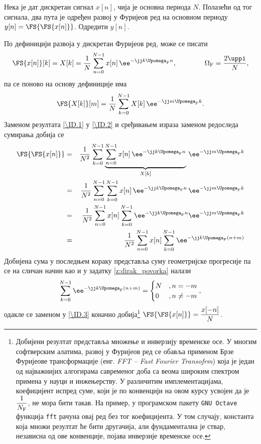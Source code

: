 \PID
Нека је дат дискретан сигнал $x[n]$, чија је основна периода $N$. Полазећи од тог сигнала, два пута је одређен развој у Фуријеов ред на 
основном периоду $y[n] = \FS{\FS{x[n]}}$. Одредити $y[n]$. 

\RESENJE
По дефиницији развоја у дискретан Фуријеов ред, може се писати 
\begin{equation}
    \FS{x[n]}[k] = X[k] = \dfrac{1}{N} \sum_{n = 0}^{N-1} x[n] \, \ee^{-\jj k \Upomega_{\rm F} n}, \qquad\qquad \Omega_{\rm F} = \dfrac{2\uppi}{N},
    \label{\ID.1}
\end{equation}
па се поново на основу дефиниције има 
\begin{eqnarray}
    \FS{X[k]}[m] = \dfrac{1}{N} \sum_{k = 0}^{N-1} X[k] \, \ee^{-\jj m \Upomega_{\rm F} k}. \label{\ID.2}
\end{eqnarray}
Заменом резултата \eqref{\ID.1} у \eqref{\ID.2} и сређивањем израза заменом редоследа сумирања добија се 
\begin{eqnarray}
    \FS{\FS{x[n]}} 
    &=&
    \dfrac{1}{N^2} 
    \sum_{k = 0}^{N-1} 
    \underbrace{ \sum_{n = 0}^{N-1} x[n] \, \ee^{-\jj k \Upomega_{\rm F} n} }_{X[k]}
    \, \ee^{-\jj m \Upomega_{\rm F} k}
    \\ 
    &=& 
    \dfrac{1}{N^2} 
    \sum_{n = 0}^{N-1}
    \sum_{k = 0}^{N-1} 
    x[n] \, \ee^{-\jj k \Upomega_{\rm F} n} 
    \, \ee^{-\jj m \Upomega_{\rm F} k} \\
    &=& 
    \dfrac{1}{N^2} 
    \sum_{n = 0}^{N-1}
    x[n]
    \sum_{k = 0}^{N-1} 
    \ee^{-\jj k \Upomega_{\rm F} n} 
    \ee^{-\jj m \Upomega_{\rm F} k}
    \\
    &=& 
    \dfrac{1}{N^2} 
    \sum_{n = 0}^{N-1}
    x[n]
    \sum_{k = 0}^{N-1} 
    \ee^{-\jj k \Upomega_{\rm F} (n + m)} \label{\ID.3}
\end{eqnarray}
Добијена сума у последњем кораку представља суму геометријске прогресије па се на сличан начин као и у задатку
\ref{z:dirak_povorka} налази
\begin{equation}
    \sum_{k = 0}^{N-1} 
    \ee^{-\jj k \Upomega_{\rm F} (n + m)}  
    = 
    \begin{cases}
        N &, n = -m \\
        0 &, n \neq -m
    \end{cases},
\end{equation}
одакле се заменом у \eqref{\ID.3} коначно добија\footnote{Добијени резултат 
представља множење и инверзију временске осе. У многим софтверским алатима, развој у Фуријеов ред се обавља 
применом Брзе Фуријеове трансформације (енг. \textit{FFT -- Fast Fourier Transofrm}) која је један од најважнијих алгогирама савременог
доба са веома широким спектром примена у науци и инжењерству. 
У различитим имплементацијама, коефицијент испред суме, који је по конвенцији 
на овом курсу усвојен да је $\dfrac{1}{N_{\rm F}}$,  не мора бити такав. 
На пример, у програмском пакету \texttt{GNU Octave} функција \texttt{fft} рачуна 
овај ред без тог коефицијента. У том случају, константа која множи резултат ће бити другачија, 
али фундаментална је ствар, независна од ове конвенције, појава инверзије временске осе.} $\FS{\FS{x[n]}} = \dfrac{x[-n]}{N}$. 

